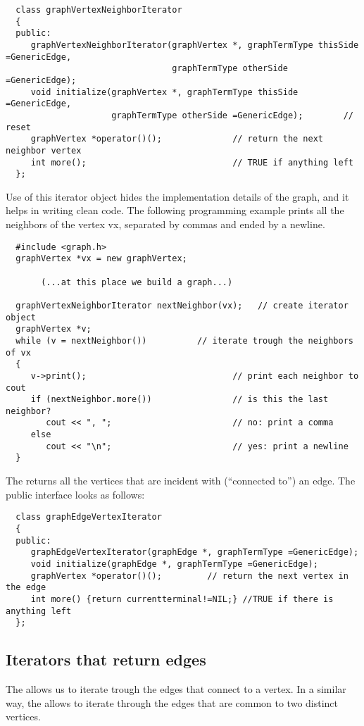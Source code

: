 {\footnotesize \begin{verbatim}
  class graphVertexNeighborIterator
  {
  public:
     graphVertexNeighborIterator(graphVertex *, graphTermType thisSide =GenericEdge,
                                 graphTermType otherSide =GenericEdge);
     void initialize(graphVertex *, graphTermType thisSide =GenericEdge,
                     graphTermType otherSide =GenericEdge);        // reset
     graphVertex *operator()();              // return the next neighbor vertex
     int more();                             // TRUE if anything left
  };
\end{verbatim}}

Use of this iterator object hides the implementation details of the graph, and
it helps in writing clean code. The following programming example prints all
the neighbors of the vertex vx, separated by commas and ended by a newline.

{\footnotesize \begin{verbatim}
  #include <graph.h>
  graphVertex *vx = new graphVertex;

       (...at this place we build a graph...)

  graphVertexNeighborIterator nextNeighbor(vx);   // create iterator object
  graphVertex *v;
  while (v = nextNeighbor())          // iterate trough the neighbors of vx
  {
     v->print();                             // print each neighbor to cout
     if (nextNeighbor.more())                // is this the last neighbor?
        cout << ", ";                        // no: print a comma
     else
        cout << "\n";                        // yes: print a newline
  }
\end{verbatim}}

The  returns all the vertices that are incident
with (``connected to'') an edge. The public interface looks as follows:

{\footnotesize \begin{verbatim}
  class graphEdgeVertexIterator
  {
  public:
     graphEdgeVertexIterator(graphEdge *, graphTermType =GenericEdge);
     void initialize(graphEdge *, graphTermType =GenericEdge);
     graphVertex *operator()();         // return the next vertex in the edge
     int more() {return currentterminal!=NIL;} //TRUE if there is anything left
  };
\end{verbatim}}

\subsection{Iterators that return edges}
The  allows us to iterate trough the edges that
connect to a vertex. In a similar way, the 
allows to iterate through the edges that are common to two distinct vertices.

